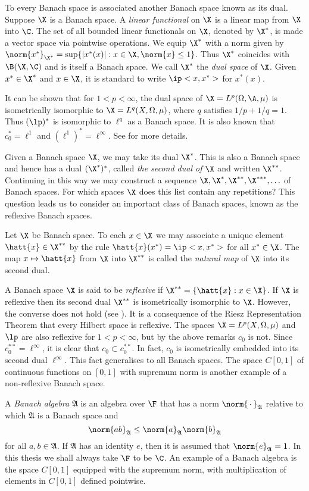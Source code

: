 To every Banach space is associated another Banach space known as its dual.
Suppose $\X$ is a Banach space. A {\em linear functional} on $\X$ is a linear
map from $\X$ into $\C$. The set of all bounded linear functionals on $\X$,
denoted
by $\X^*$, is made a vector space via pointwise operations. We equip $\X^*$ with
a norm given by $\norm{x^*}_{\X^*}=\sup\{|x^*(x)|:x\in\X,\norm{x}\leq 1\}$.
Thus $\X^*$ coincides with $\B(\X,\C)$ and is itself a Banach
space. We call $\X^*$ the {\em dual space} of $\X$. Given $x^*\in\X^*$ and
$x\in\X$, it is standard to write
$\ip<x,x^*>$ for $x^*(x)$.

It can be shown that for $1<p<\infty$, the dual space of $\X=L^p(\Omega,\A,\mu)$
is isometrically isomorphic to $\X=L^q(X,\Omega,\mu)$, where $q$ satisfies
$1/p+1/q=1$. Thus $(\lp)^*$ is isomorphic to $\ell^q$ as a Banach space. It is
also known that $c_0^*=\ell^1$ and $(\ell^1)^*=\ell^{\infty}$. See
\cite[Chapter III, \S 5 and \S 11]{Con} for more details.

Given a Banach space $\X$, we may take its dual $\X^*$. This is also a Banach
space and hence has a dual $(\X^*)^*$, called {\em the second dual of $\X$}
and written $\X^{**}$. Continuing in this way we may construct a sequence
$\X,\X^*,\X^{**},\X^{***},\ldots$ of Banach spaces. For which
spaces $\X$ does this list contain any repetitions? This question leads us to
consider an important class of Banach spaces, known as the reflexive Banach
spaces.

Let $\X$ be Banach space. To each $x\in\X$ we may associate a unique element
$\hatt{x}\in\X^{**}$ by the rule $\hatt{x}(x^*)=\ip<x,x^*>$ for all $x^*\in\X$.
The map $x\mapsto\hatt{x}$ from $\X$ into $\X^{**}$ is called the {\em natural
map} of $\X$ into its second dual.

A Banach space $\X$ is said to be {\em reflexive} if
$\X^{**}=\{\hatt{x}:x\in\X\}$. If $\X$ is reflexive then its second dual
$\X^{**}$ is isometrically isomorphic to $\X$. However, the converse does not
hold (see \cite[III.11]{Con}). It is a consequence of the Riesz Representation
Theorem \cite[I.3.4]{Con} that every Hilbert space is reflexive.
The spaces $\X=L^p(X,\Omega,\mu)$ and
$\lp$ are also reflexive for $1<p<\infty$, but by the above remarks $c_0$ is
not. Since
$c_0^{**}=\ell^{\infty}$, it is clear that $c_0\subset c_0^{**}$. In fact,
$c_0$ is isometrically embedded into its second dual $\ell^{\infty}$. This fact
generalises to
all Banach spaces. The space $C[0,1]$ of continuous functions on $[0,1]$ with
supremum norm is another example of a non-reflexive Banach space.

A {\em Banach algebra} $\mathfrak{A}$ is an algebra over $\F$ that has a norm
$\norm{\,\cdot\,}_{\mathfrak{A}}$ relative to which $\mathfrak{A}$ is a Banach
space and
\[\norm{ab}_{\mathfrak{A}}\leq\norm{a}_{\mathfrak{A}}\norm{b}_{\mathfrak{A}}\]
for all $a,b\in\mathfrak{A}$. If $\mathfrak{A}$ has an identity $e$, then it is
assumed that $\norm{e}_{\mathfrak{A}}=1$. In this thesis we shall always take
$\F$ to be $\C$. An example of a Banach algebra is the space $C[0,1]$ equipped
with the supremum norm, with multiplication of elements in $C[0,1]$ defined
pointwise.

